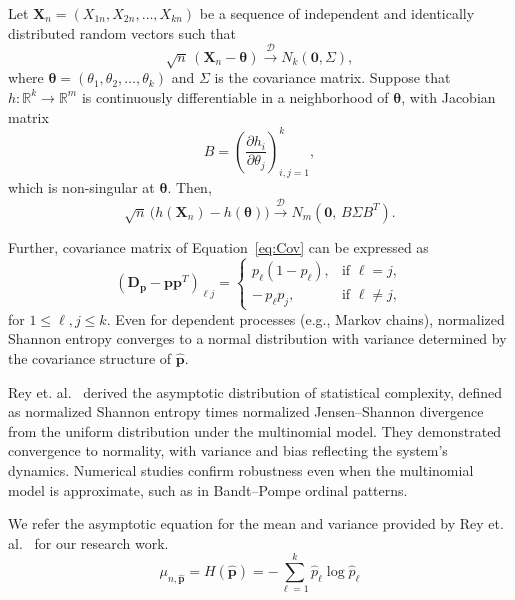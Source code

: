\begin{theorem}
	Let $\mathbf{X}_n= (X_{1n}, X_{2n}, \dots, X_{kn})$ be a sequence of independent and identically distributed random vectors such that 
	\[
	\sqrt{n}\,(\mathbf{X}_n - \boldsymbol{\theta}) \xrightarrow{\mathscr{D}} N_k(\mathbf{0},\Sigma),
	\]
	where $\boldsymbol{\theta} = (\theta_1,\theta_2,\dots,\theta_k)$ and $\Sigma$ is the covariance matrix. 
	Suppose that $h\colon\mathbb{R}^k \to \mathbb{R}^m$ is continuously differentiable in a neighborhood of $\boldsymbol{\theta}$, with Jacobian matrix
	\[
	B = \left( \frac{\partial h_i}{\partial \theta_j} \right)_{i,j=1}^k,
	\]
	which is non-singular at $\boldsymbol{\theta}$. Then,
	\[
	\sqrt{n}\,\big(h(\mathbf{X}_n)-h(\boldsymbol{\theta})\big) \xrightarrow{\mathscr{D}} N_m\!\left(\mathbf{0},\, B \Sigma B^T\right).
	\]
\end{theorem}

Further, covariance matrix of Equation~\eqref{eq:Cov} can be expressed as 
\begin{equation}
	(\mathbf{D_p}-\mathbf{pp}^T)_{\ell j} =
	\begin{cases}
		p_{\ell}(1-p_{\ell}), & \text{if } \ell = j, \\[6pt]
		-\,p_{\ell}p_{j}, & \text{if } \ell \neq j,
	\end{cases}
\end{equation}
for $1\leq {\ell}, j\leq k.$
Even for dependent processes (e.g., Markov chains), normalized Shannon entropy converges to a normal distribution with variance determined by the covariance structure of $\widehat{\mathbf{p}}$. 

Rey et. al.~\cite{Rey2025} derived the asymptotic distribution of statistical complexity, defined as normalized Shannon entropy times normalized Jensen–Shannon divergence from the uniform distribution under the multinomial model. They demonstrated convergence to normality, with variance and bias reflecting the system’s dynamics. Numerical studies confirm robustness even when the multinomial model is approximate, such as in Bandt–Pompe ordinal patterns. 

We refer the asymptotic equation for the mean and variance provided by Rey et. al.~\cite{Rey2025} for our research work.
\begin{equation}
	\mu_{n,\widehat{\mathbf{p}}}	= H(\widehat{\mathbf{p}})
	= -\sum_{\ell=1}^k \widehat{p}_\ell \log \widehat{p}_\ell 
	\label{eq:AsympMean}
\end{equation}  

